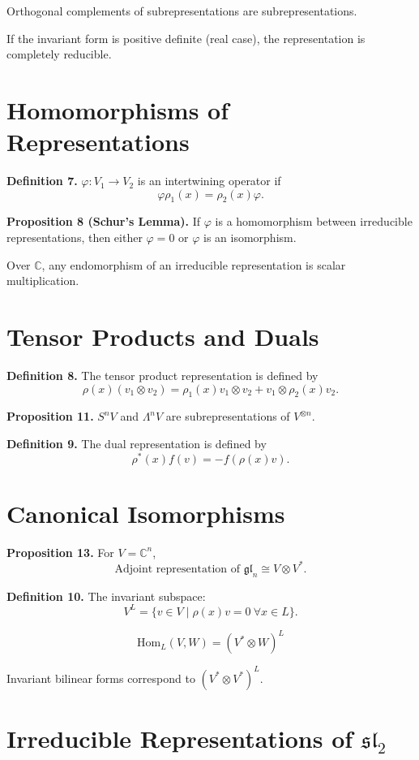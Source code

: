 Orthogonal complements of subrepresentations are subrepresentations.

If the invariant form is positive definite (real case), the representation is completely reducible.

\section*{Homomorphisms of Representations}

\textbf{Definition 7.}
$\varphi : V_1 \to V_2$ is an intertwining operator if
\[
\varphi \rho_1(x) = \rho_2(x) \varphi.
\]

\textbf{Proposition 8 (Schur's Lemma).}
If $\varphi$ is a homomorphism between irreducible representations,
then either $\varphi=0$ or $\varphi$ is an isomorphism.

Over $\mathbb{C}$, any endomorphism of an irreducible representation is scalar multiplication.

\section*{Tensor Products and Duals}

\textbf{Definition 8.}
The tensor product representation is defined by
\[
\rho(x)(v_1 \otimes v_2)
=
\rho_1(x)v_1 \otimes v_2
+
v_1 \otimes \rho_2(x)v_2.
\]

\textbf{Proposition 11.}
$S^n V$ and $\Lambda^n V$ are subrepresentations of $V^{\otimes n}$.

\textbf{Definition 9.}
The dual representation is defined by
\[
\rho^*(x)f(v) = -f(\rho(x)v).
\]

\section*{Canonical Isomorphisms}

\textbf{Proposition 13.}
For $V=\mathbb{C}^n$,
\[
\text{Adjoint representation of } \mathfrak{gl}_n
\cong V \otimes V^*.
\]

\textbf{Definition 10.}
The invariant subspace:
\[
V^L = \{ v \in V \mid \rho(x)v=0 \ \forall x\in L \}.
\]

\[
\mathrm{Hom}_L(V,W) = (V^* \otimes W)^L
\]

Invariant bilinear forms correspond to $(V^* \otimes V^*)^L$.

\section*{Irreducible Representations of $\mathfrak{sl}_2$}

